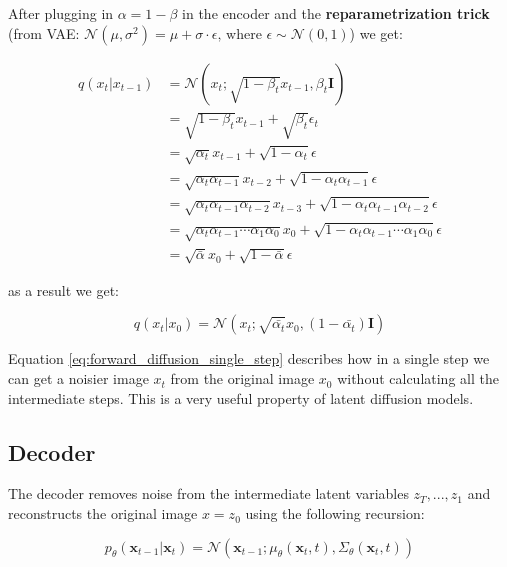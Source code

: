 After plugging in $\alpha = 1 - \beta$ in the encoder and the \textbf{reparametrization trick} (from VAE: $\mathcal{N} (\mu, \sigma^2) = \mu + \sigma \cdot \epsilon \text{, where } \epsilon \sim \mathcal{N}(0, 1) $) we get:

\begin{align*}
    q(x_t | x_{t-1}) &= \mathcal{N} \left( x_t; \sqrt{1-\beta_t} x_{t-1}, \beta_t \mathbf{I} \right) \\
    &= \sqrt{1-\beta_t} x_{t-1} + \sqrt{\beta_t} \epsilon_t \\
    &= \sqrt{\alpha_t} x_{t-1} + \sqrt{1 - \alpha_t} \epsilon \\
    &= \sqrt{\alpha_t \alpha_{t-1}} x_{t-2} + \sqrt{1 - \alpha_t \alpha_{t-1}} \epsilon \\
    &= \sqrt{\alpha_t \alpha_{t-1} \alpha_{t-2}} x_{t-3} + \sqrt{1 - \alpha_t \alpha_{t-1} \alpha_{t-2}} \epsilon \\
    &= \sqrt{\alpha_t \alpha_{t-1} \cdots \alpha_1 \alpha_0} x_0 + \sqrt{1 - \alpha_t \alpha_{t-1} \cdots \alpha_1 \alpha_0} \epsilon \\
    &= \boxed{ \sqrt{\bar{\alpha}} x_0 + \sqrt{1 - \bar{\alpha}} \epsilon }
\end{align*}

as a result we get:

\begin{equation}
    q(x_t | x_0) = \mathcal{N} (x_t; \sqrt{\bar{\alpha_t}} x_0, (1-\bar{\alpha_t}) \mathbf{I})
    \label{eq:forward_diffusion_single_step}
\end{equation}

Equation \ref{eq:forward_diffusion_single_step} describes how in a single step we can get a noisier image $x_t$ from the original image $x_0$ without calculating all the intermediate steps. This is a very useful property of latent diffusion models.









\subsection{Decoder}

The decoder removes noise from the intermediate latent variables $z_T, ..., z_1$ and reconstructs the original image $x = z_0$ using the following recursion:

\begin{equation}
    p_\theta(\mathbf{x}_{t-1} | \mathbf{x}_t) = \mathcal{N}(\mathbf{x}_{t-1}; \mu_\theta(\mathbf{x}_t, t), \Sigma_\theta(\mathbf{x}_t, t))
    \label{eq:reverse_diffusion}
\end{equation}

